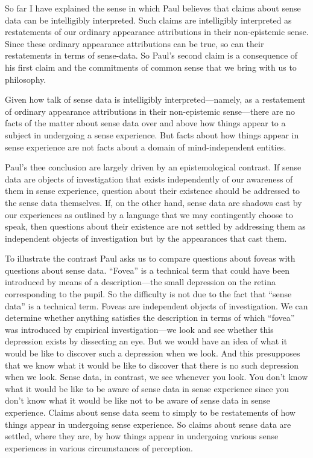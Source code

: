 \documentclass[11pt]{article}
\begin{document}
So far I have explained the sense in which Paul believes that claims about sense data can be intelligibly interpreted. Such claims are intelligibly interpreted as restatements of our ordinary appearance attributions in their non-epistemic sense. Since these ordinary appearance attributions can be true, so can their restatements in terms of sense-data. So Paul's second claim is a consequence of his first claim and the commitments of common sense that we bring with us to philosophy.

Given how talk of sense data is intelligibly interpreted---namely, as a restatement of ordinary appearance attributions in their non-epistemic sense\----there are no facts of the matter about sense data over and above how things appear to a subject in undergoing a sense experience. But facts about how things appear in sense experience are not facts about a domain of mind-independent entities. 


Paul's thee conclusion are largely driven by an epistemological contrast. If sense data are objects of investigation that exists independently of our awareness of them in sense experience, question about their existence should be addressed to the sense data themselves. If, on the other hand, sense data are shadows cast by our experiences as outlined by a language that we may contingently choose to speak, then questions about their existence are not settled by addressing them as independent objects of investigation but by the appearances that cast them.

To illustrate the contrast Paul asks us to compare questions about foveas with questions about sense data. ``Fovea'' is a technical term that could have been introduced by means of a description---the small depression on the retina corresponding to the pupil. So the difficulty is not due to the fact that ``sense data'' is a technical term. Foveas are independent objects of investigation. We can determine whether anything satisfies the description in terms of which ``fovea'' was introduced by empirical investigation---we look and see whether this depression exists by dissecting an eye. But we would have an idea of what it would be like to discover such a depression when we look. And this presupposes that we know what it would be like to discover that there is no such depression when we look. Sense data, in contrast, we see whenever you look. You don't know what it would be like to be aware of sense data in sense experience since you don't know what it would be like not to be aware of sense data in sense experience. Claims about sense data seem to simply to be restatements of how things appear in undergoing sense experience. So claims about sense data are settled, where they are, by how things appear in undergoing various sense experiences in various circumstances of perception.
\end{document}
